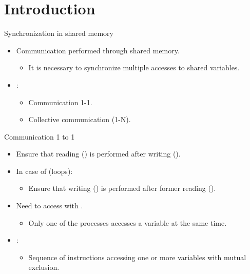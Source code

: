 \section{Introduction}

\begin{frame}[t]{Synchronization in shared memory}
\begin{itemize}
  \item Communication performed through shared memory.
    \begin{itemize}
      \item It is necessary to synchronize multiple accesses to shared variables.
    \end{itemize}

  \item {}:
    \begin{itemize}
      \item Communication 1-1.
      \item Collective communication (1-N).
    \end{itemize}
\end{itemize}
\end{frame}

\begin{frame}[t]{Communication 1 to 1}
\begin{itemize}
  \item Ensure that reading () is performed after
        writing ().
  
  \item In case of  (loops):
    \begin{itemize}
      \item Ensure that writing () is performed after former reading ().
    \end{itemize}

  \item Need to access with .
    \begin{itemize}
      \item Only one of the processes accesses a variable at the same time.
    \end{itemize}

  \item {}:
    \begin{itemize}
      \item Sequence of instructions accessing one or more variables with mutual exclusion.
    \end{itemize}

\end{itemize}
\end{frame}

